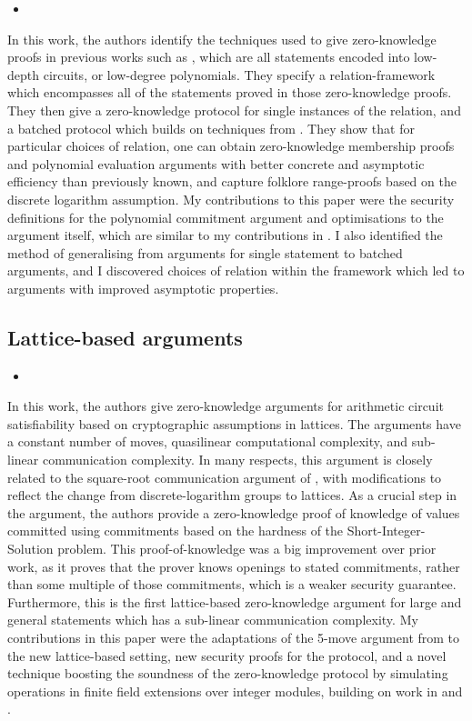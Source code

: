 \begin{itemize}
\item {}
\end{itemize}

In this work, the authors identify the techniques used to give zero-knowledge proofs in previous works such as \cite{BayerG13, GrothK15, BootleCCGGP15}, which are all statements encoded into low-depth circuits, or low-degree polynomials. They specify a relation-framework which encompasses all of the statements proved in those zero-knowledge proofs. They then give a zero-knowledge protocol for single instances of the relation, and a batched protocol which builds on techniques from \cite{Bayer2014}. They show that for particular choices of relation, one can obtain zero-knowledge membership proofs and polynomial evaluation arguments with better concrete and asymptotic efficiency than previously known, and capture folklore range-proofs based on the discrete logarithm assumption. My contributions to this paper were the security definitions for the polynomial commitment argument and optimisations to the argument itself, which are similar to my contributions in \cite{BootleCCGP16}. I also identified the method of generalising from arguments for single statement to batched arguments, and I discovered choices of relation within the framework which led to arguments with improved asymptotic properties.

\subsection*{Lattice-based arguments}

\begin{itemize}
\item {}
\end{itemize}

In this work, the authors give zero-knowledge arguments for arithmetic circuit satisfiability based on cryptographic assumptions in lattices. The arguments have a constant number of moves, quasilinear computational complexity, and sub-linear communication complexity. In many respects, this argument is closely related to the square-root communication argument of \cite{BootleCCGP16}, with modifications to reflect the change from discrete-logarithm groups to lattices. As a crucial step in the argument, the authors provide a zero-knowledge proof of knowledge of values committed using commitments based on the hardness of the Short-Integer-Solution problem. This proof-of-knowledge was a big improvement over prior work, as it proves that the prover knows openings to stated commitments, rather than some multiple of those commitments, which is a weaker security guarantee. Furthermore, this is the first lattice-based zero-knowledge argument for large and general statements which has a sub-linear communication complexity. My contributions in this paper were the adaptations of the 5-move argument from \cite{BootleCCGP16} to the new lattice-based setting, new security proofs for the protocol, and a novel technique boosting the soundness of the zero-knowledge protocol by simulating operations in finite field extensions over integer modules, building on work in \cite{CramerDP12} and \cite{CramerDK14}.

